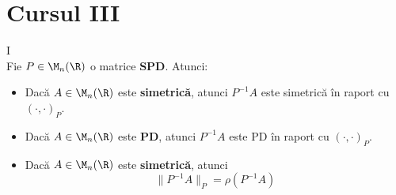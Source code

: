 
\section*{Cursul III}

\begin{lema}{I}
    \text{ }\\[0.5em]
    Fie $P \in \M_n(\R)$ o matrice \textbf{SPD}. Atunci:
    \begin{itemize}
        \item[(i)] Dacă $A \in \M_n(\R)$ este \textbf{simetrică}, atunci $P^{-1}A$ este simetrică în raport cu $(\cdot,\cdot)_P$.
        \item[(ii)] Dacă $A \in \M_n(\R)$ este \textbf{PD}, atunci $P^{-1}A$ este PD în raport cu $(\cdot,\cdot)_P$.
        \item[(iii)] Dacă $A \in \M_n(\R)$ este \textbf{simetrică}, atunci
        $$
        \|P^{-1}A\|_P = \rho(P^{-1}A)
        $$
    \end{itemize}
\end{lema}

